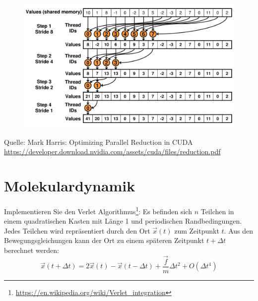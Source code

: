 \documentclass[headsepline=3pt,headinclude=true,12pt,oneside]{scrartcl}
\begin{document}
		\begin{figure}[h]
			\centering
			\includegraphics[scale=0.4]{exercise/3.png}		
		\end{figure}
		
		Quelle: Mark Harris: Optimizing Parallel Reduction in CUDA\\ 
		\url{https://developer.download.nvidia.com/assets/cuda/files/reduction.pdf}
		
	\section{Molekulardynamik}
	Implementieren Sie den Verlet Algorithmus\footnote{\url{https://en.wikipedia.org/wiki/Verlet_integration}}: Es befinden sich $n$ Teilchen in einem quadratischen Kasten mit Länge 1 und periodischen Randbedingungen. Jedes Teilchen wird repräsentiert durch den Ort $\vec{x}(t)$ zum Zeitpunkt $t$.
	Aus den Bewegungsgleichungen kann der Ort zu einem späteren Zeitpunkt $t+\Delta t$ berechnet werden:
	\begin{equation}
		\vec{x}(t+\Delta t) = 2\vec{x}(t) - \vec{x}(t-\Delta t) + \frac{\vec{f}}{m}\Delta t^2 + O(\Delta t^4)
	\end{equation}
	
\end{document}
